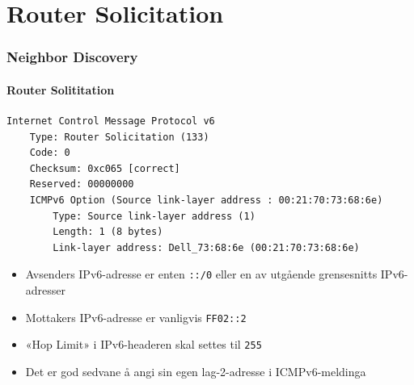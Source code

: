\section{Router Solicitation}
\begin{frame}[fragile]
  \frametitle{Neighbor Discovery}
  \framesubtitle{Router Solititation}
\begin{Verbatim}[fontsize=\tiny]
Internet Control Message Protocol v6
    Type: Router Solicitation (133)
    Code: 0
    Checksum: 0xc065 [correct]
    Reserved: 00000000
    ICMPv6 Option (Source link-layer address : 00:21:70:73:68:6e)
        Type: Source link-layer address (1)
        Length: 1 (8 bytes)
        Link-layer address: Dell_73:68:6e (00:21:70:73:68:6e)
\end{Verbatim}
  \begin{itemize}
  \item Avsenders IPv6-adresse er enten \texttt{::/0} eller en av
    utgående grensesnitts IPv6-adresser
  \item Mottakers IPv6-adresse er vanligvis \texttt{FF02::2}
  \item «Hop Limit» i IPv6-headeren skal settes til \texttt{255}
  \item Det er god sedvane å angi sin egen lag-2-adresse i ICMPv6-meldinga
  \end{itemize}
\end{frame}

